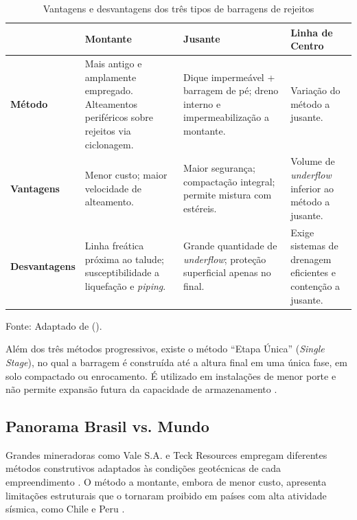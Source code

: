 \begin{table}[h!]
    \centering
    \caption{Vantagens e desvantagens dos três tipos de barragens de rejeitos}
    \label{tab:vantagens_desvantagens}
    \begin{tabular}{|p{2.3cm}|p{3.8cm}|p{3.8cm}|p{3.8cm}|}
        \hline
         & \textbf{Montante} & \textbf{Jusante} & \textbf{Linha de Centro} \\
        \hline
        \textbf{Método} &
        Mais antigo e amplamente empregado. Alteamentos periféricos sobre rejeitos via ciclonagem. &
        Dique impermeável + barragem de pé; dreno interno e impermeabilização a montante. &
        Variação do método a jusante. \\
        \hline
        \textbf{Vantagens} &
        Menor custo; maior velocidade de alteamento. &
        Maior segurança; compactação integral; permite mistura com estéreis. &
        Volume de \textit{underflow} inferior ao método a jusante. \\
        \hline
        \textbf{Desvantagens} &
        Linha freática próxima ao talude; susceptibilidade a liquefação e \textit{piping}. &
        Grande quantidade de \textit{underflow}; proteção superficial apenas no final. &
        Exige sistemas de drenagem eficientes e contenção a jusante. \\
        \hline
    \end{tabular}
    \footnotesize
    Fonte: Adaptado de \citeauthor{lozano2006} (\citeyear{lozano2006}).
\end{table}

Além dos três métodos progressivos, existe o método ``Etapa Única'' (\textit{Single Stage}), no qual a barragem é construída até a altura final em uma única fase, em solo compactado ou enrocamento. É utilizado em instalações de menor porte e não permite expansão futura da capacidade de armazenamento \cite{vale2024, teck2019}.

\subsection{Panorama Brasil vs. Mundo}

Grandes mineradoras como Vale S.A. e Teck Resources empregam diferentes métodos construtivos adaptados às condições geotécnicas de cada empreendimento \cite{vale2024, teck2019}. O método a montante, embora de menor custo, apresenta limitações estruturais que o tornaram proibido em países com alta atividade sísmica, como Chile e Peru \cite{thome2018}.

